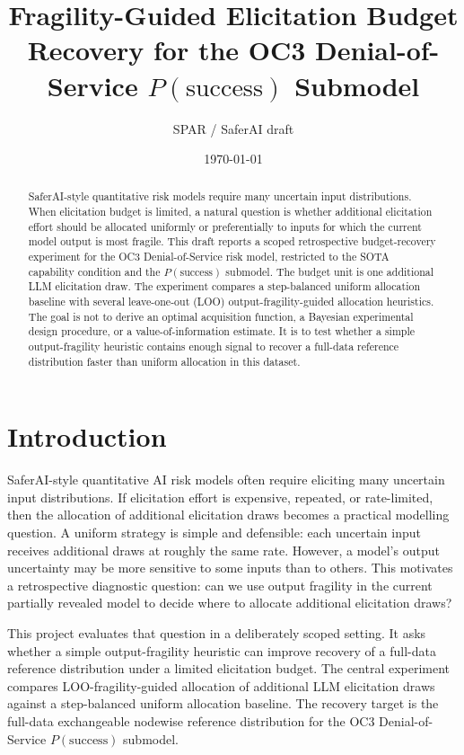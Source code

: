 \documentclass[11pt]{article}
\title{Fragility-Guided Elicitation Budget Recovery for the OC3 Denial-of-Service \texorpdfstring{$P(\mathrm{success})$}{P(success)} Submodel}
\author{SPAR / SaferAI draft}
\date{\today}
\newcommand{\psuccess}{P(\mathrm{success})}
\begin{document}
\maketitle

\begin{abstract}
SaferAI-style quantitative risk models require many uncertain input distributions. When elicitation budget is limited, a natural question is whether additional elicitation effort should be allocated uniformly or preferentially to inputs for which the current model output is most fragile. This draft reports a scoped retrospective budget-recovery experiment for the OC3 Denial-of-Service risk model, restricted to the SOTA capability condition and the \(\psuccess\) submodel. The budget unit is one additional LLM elicitation draw. The experiment compares a step-balanced uniform allocation baseline with several leave-one-out (LOO) output-fragility-guided allocation heuristics. The goal is not to derive an optimal acquisition function, a Bayesian experimental design procedure, or a value-of-information estimate. It is to test whether a simple output-fragility heuristic contains enough signal to recover a full-data reference distribution faster than uniform allocation in this dataset.
\end{abstract}

\tableofcontents
\newpage

\section{Introduction}

SaferAI-style quantitative AI risk models often require eliciting many uncertain input distributions. If elicitation effort is expensive, repeated, or rate-limited, then the allocation of additional elicitation draws becomes a practical modelling question. A uniform strategy is simple and defensible: each uncertain input receives additional draws at roughly the same rate. However, a model's output uncertainty may be more sensitive to some inputs than to others. This motivates a retrospective diagnostic question: can we use output fragility in the current partially revealed model to decide where to allocate additional elicitation draws?

This project evaluates that question in a deliberately scoped setting. It asks whether a simple output-fragility heuristic can improve recovery of a full-data reference distribution under a limited elicitation budget. The central experiment compares LOO-fragility-guided allocation of additional LLM elicitation draws against a step-balanced uniform allocation baseline. The recovery target is the full-data exchangeable nodewise reference distribution for the OC3 Denial-of-Service \(\psuccess\) submodel.
\end{document}
